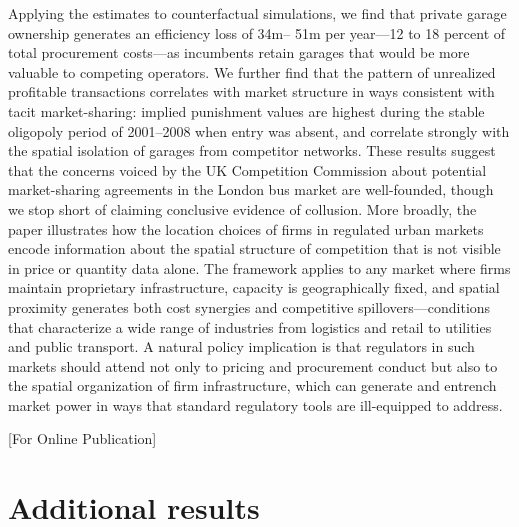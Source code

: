 \documentclass[12pt]{article}
\begin{document}
Applying the estimates to counterfactual simulations, we find that private 
garage ownership generates an efficiency loss of \textsterling 34m-- 
\textsterling 51m per year---12 to 18 percent of total procurement 
costs---as incumbents retain garages that would be more valuable to 
competing operators. We further find that the pattern of unrealized 
profitable transactions correlates with market structure in ways consistent 
with tacit market-sharing: implied punishment values are highest during 
the stable oligopoly period of 2001--2008 when entry was absent, and 
correlate strongly with the spatial isolation of garages from competitor 
networks. These results suggest that the concerns voiced by the UK 
Competition Commission about potential market-sharing agreements in the 
London bus market are well-founded, though we stop short of claiming 
conclusive evidence of collusion. More broadly, the paper illustrates how 
the location choices of firms in regulated urban markets encode information 
about the spatial structure of competition that is not visible in price or 
quantity data alone. The framework applies to any market where firms 
maintain proprietary infrastructure, capacity is geographically fixed, and 
spatial proximity generates both cost synergies and competitive 
spillovers---conditions that characterize a wide range of industries from 
logistics and retail to utilities and public transport. A natural 
policy implication is that regulators in such markets should attend not 
only to pricing and procurement conduct but also to the spatial 
organization of firm infrastructure, which can generate and entrench 
market power in ways that standard regulatory tools are ill-equipped 
to address.


\newpage

 




\newpage
\clearpage
\appendix

\begin{center}{\large{[For Online Publication]}}\end{center}


\section{Additional results}

\setcounter{table}{0}
\renewcommand{\thetable}{A\arabic{table}}
\setcounter{figure}{0}
\renewcommand{\thefigure}{A\arabic{figure}}
\end{document}
